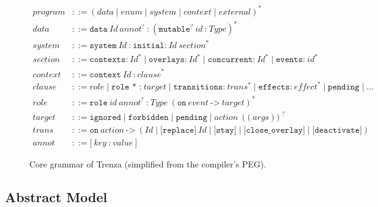 \begin{figure}[t]
\small
\begin{align*}
\mathit{program}   &::= (\mathit{data} \mid \mathit{enum} \mid \mathit{system} \mid \mathit{context} \mid \mathit{external})^{*}\\
\mathit{data}      &::= \texttt{data}\ \mathit{Id}\ \mathit{annot}^{?}\ \texttt{:}\ (\texttt{mutable}^{?}\ \mathit{id}\ \texttt{:}\ \mathit{Type})^{*}\\
\mathit{system}    &::= \texttt{system}\ \mathit{Id}\ \texttt{:}\ \texttt{initial:}\ \mathit{Id}\ \mathit{section}^{*}\\
\mathit{section}   &::= \texttt{contexts:}\ \mathit{Id}^{*} \mid \texttt{overlays:}\ \mathit{Id}^{*} \mid \texttt{concurrent:}\ \mathit{Id}^{*} \mid \texttt{events:}\ \mathit{id}^{*}\\
\mathit{context}   &::= \texttt{context}\ \mathit{Id}\ \texttt{:}\ \mathit{clause}^{*}\\
\mathit{clause}    &::= \mathit{role} \mid \texttt{role * :}\ \mathit{target} \mid \texttt{transitions:}\ \mathit{trans}^{*} \mid \texttt{effects:}\ \mathit{effect}^{*} \mid \texttt{pending} \mid \dots\\
\mathit{role}      &::= \texttt{role}\ \mathit{id}\ \mathit{annot}^{?}\ \texttt{:}\ \mathit{Type}\ (\texttt{on}\ \mathit{event}\ \texttt{->}\ \mathit{target})^{*}\\
\mathit{target}    &::= \texttt{ignored} \mid \texttt{forbidden} \mid \texttt{pending} \mid \mathit{action}\ (\texttt{(}\ \mathit{args}\ \texttt{)})^{?}\\
\mathit{trans}     &::= \texttt{on}\ \mathit{action}\ \texttt{->}\ (\mathit{Id} \mid \texttt{[replace]}\ \mathit{Id} \mid \texttt{[stay]} \mid \texttt{[close\_overlay]} \mid \texttt{[deactivate]})\\
\mathit{annot}     &::= \texttt{[}\ \mathit{key}\ \texttt{:}\ \mathit{value}\ \texttt{]}
\end{align*}
\caption{Core grammar of Trenza (simplified from the compiler's PEG).}
\label{fig:grammar}
\end{figure}

\subsection{Abstract Model}
\label{sec:model}

